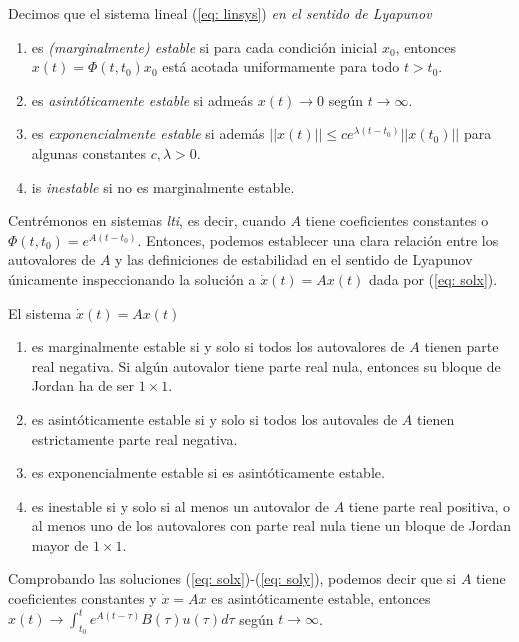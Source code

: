 Decimos que el sistema lineal (\ref{eq: linsys}) \emph{en el sentido de Lyapunov}
\begin{enumerate}
	\item es \emph{(marginalmente) estable} si para cada condición inicial $x_0$, entonces $x(t) = \Phi(t,t_0) x_0$ está acotada uniformamente para todo $t>t_0$.
	\item es \emph{asintóticamente estable} si admeás $x(t) \to 0$ según $t\to\infty$.
	\item es \emph{exponencialmente estable} si además $||x(t)|| \leq c e^{\lambda(t-t_0)}||x(t_0)||$ para algunas constantes $c,\lambda > 0$.
	\item is \emph{inestable} si no es marginalmente estable.
\end{enumerate}


Centrémonos en sistemas \emph{lti}, es decir, cuando $A$ tiene coeficientes constantes o $\Phi(t,t_0) = e^{A(t-t_0)}$. Entonces, podemos establecer una clara relación entre los autovalores de $A$ y las definiciones de estabilidad en el sentido de Lyapunov únicamente inspeccionando la solución a $\dot x(t) = Ax(t)$ dada por (\ref{eq: solx}).

El sistema $\dot x(t) = Ax(t)$
\begin{enumerate}
	\item es marginalmente estable si y solo si todos los autovalores de $A$ tienen parte real negativa. Si algún autovalor tiene parte real nula, entonces su bloque de Jordan ha de ser $1\times 1$.
	\item es asintóticamente estable si y solo si todos los autovales de $A$ tienen estrictamente parte real negativa.
	\item es exponencialmente estable si es asintóticamente estable.
	\item es inestable si y solo si al menos un autovalor de $A$ tiene parte real positiva, o al menos uno de los autovalores con parte real nula tiene un bloque de Jordan mayor de $1\times 1$.
\end{enumerate}

Comprobando las soluciones (\ref{eq: solx})-(\ref{eq: soly}), podemos decir que si $A$ tiene coeficientes constantes y $\dot x = Ax$ es asintóticamente estable, entonces $x(t) \to \int_{t_0}^t e^{A(t-\tau)}B(\tau)u(\tau)d\tau$ según $t\to\infty$. 

